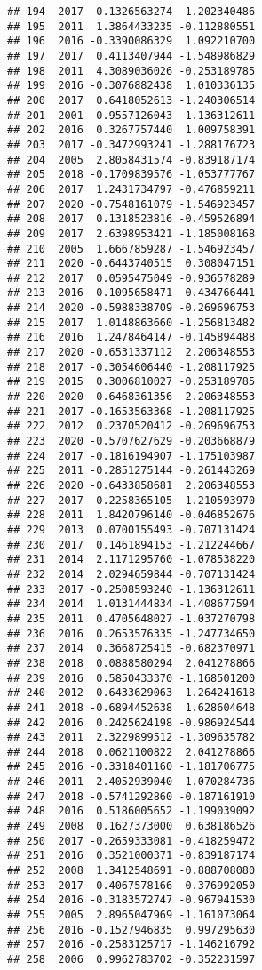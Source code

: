 \documentclass[
]{article}
\begin{document}
\begin{verbatim}
## 194  2017  0.1326563274 -1.202340486
## 195  2011  1.3864433235 -0.112880551
## 196  2016 -0.3390086329  1.092210700
## 197  2017  0.4113407944 -1.548986829
## 198  2011  4.3089036026 -0.253189785
## 199  2016 -0.3076882438  1.010336135
## 200  2017  0.6418052613 -1.240306514
## 201  2001  0.9557126043 -1.136312611
## 202  2016  0.3267757440  1.009758391
## 203  2017 -0.3472993241 -1.288176723
## 204  2005  2.8058431574 -0.839187174
## 205  2018 -0.1709839576 -1.053777767
## 206  2017  1.2431734797 -0.476859211
## 207  2020 -0.7548161079 -1.546923457
## 208  2017  0.1318523816 -0.459526894
## 209  2017  2.6398953421 -1.185008168
## 210  2005  1.6667859287 -1.546923457
## 211  2020 -0.6443740515  0.308047151
## 212  2017  0.0595475049 -0.936578289
## 213  2016 -0.1095658471 -0.434766441
## 214  2020 -0.5988338709 -0.269696753
## 215  2017  1.0148863660 -1.256813482
## 216  2016  1.2478464147 -0.145894488
## 217  2020 -0.6531337112  2.206348553
## 218  2017 -0.3054606440 -1.208117925
## 219  2015  0.3006810027 -0.253189785
## 220  2020 -0.6468361356  2.206348553
## 221  2017 -0.1653563368 -1.208117925
## 222  2012  0.2370520412 -0.269696753
## 223  2020 -0.5707627629 -0.203668879
## 224  2017 -0.1816194907 -1.175103987
## 225  2011 -0.2851275144 -0.261443269
## 226  2020 -0.6433858681  2.206348553
## 227  2017 -0.2258365105 -1.210593970
## 228  2011  1.8420796140 -0.046852676
## 229  2013  0.0700155493 -0.707131424
## 230  2017  0.1461894153 -1.212244667
## 231  2014  2.1171295760 -1.078538220
## 232  2014  2.0294659844 -0.707131424
## 233  2017 -0.2508593240 -1.136312611
## 234  2014  1.0131444834 -1.408677594
## 235  2011  0.4705648027 -1.037270798
## 236  2016  0.2653576335 -1.247734650
## 237  2014  0.3668725415 -0.682370971
## 238  2018  0.0888580294  2.041278866
## 239  2016  0.5850433370 -1.168501200
## 240  2012  0.6433629063 -1.264241618
## 241  2018 -0.6894452638  1.628604648
## 242  2016  0.2425624198 -0.986924544
## 243  2011  2.3229899512 -1.309635782
## 244  2018  0.0621100822  2.041278866
## 245  2016 -0.3318401160 -1.181706775
## 246  2011  2.4052939040 -1.070284736
## 247  2018 -0.5741292860 -0.187161910
## 248  2016  0.5186005652 -1.199039092
## 249  2008  0.1627373000  0.638186526
## 250  2017 -0.2659333081 -0.418259472
## 251  2016  0.3521000371 -0.839187174
## 252  2008  1.3412548691 -0.888708080
## 253  2017 -0.4067578166 -0.376992050
## 254  2016 -0.3183572747 -0.967941530
## 255  2005  2.8965047969 -1.161073064
## 256  2016 -0.1527946835  0.997295630
## 257  2016 -0.2583125717 -1.146216792
## 258  2006  0.9962783702 -0.352231597

\end{verbatim}
\end{document}
